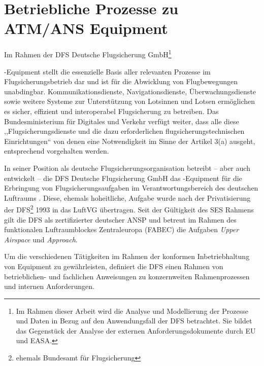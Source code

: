\chapter{Betriebliche Prozesse zu ATM/ANS Equipment}
    
    \begin{center}
        \footnotesize
        Im Rahmen der DFS Deutsche Flugsicherung GmbH\footnote{Im Rahmen dieser Arbeit wird die Analyse und Modellierung der Prozesse und Daten in Bezug auf den Anwendungsfall der \acs{DFS} betrachtet. Sie bildet das Gegenstück der Analyse der externen Anforderungsdokumente durch \acs{EU} und \ac{EASA}.}
    \end{center}
    
    \noindent
    \atmans-Equipment stellt die essenzielle Basis aller relevanten Prozesse im Flugsicherungsbetrieb dar und ist für die Abwicklung von Flugbewegungen unabdingbar. 
    Kommunikationsdienste, Navigationsdienste, Überwachungsdienste sowie weitere Systeme zur Unterstützung von Lotsinnen und Lotsen ermöglichen es sicher, effizient und interoperabel Flugsicherung zu betreiben.
    Das Bundesministerium für Digitales und Verkehr verfügt weiter, dass alle diese ,,Flugsicherungsdienste und die dazu erforderlichen flugsicherungstechnischen Einrichtungen`` von denen eine Notwendigkeit im Sinne der  Artikel 3(a) ausgeht, entsprechend vorgehalten werden.
    \cite[§27 d]{luftvg}
    
    \medskip
    In seiner Position als deutsche Flugsicherungsorganisation betreibt -- aber auch entwickelt -- die DFS Deutsche Flugsicherung GmbH das \atmans-Equipment für die Erbringung von Flugsicherungsaufgaben im Verantwortungsbereich des deutschen Luftraums 
    \cite[§27 c]{luftvg}.
    Diese, ehemals hoheitliche, Aufgabe wurde nach der Privatisierung der \ac{DFS}\footnote{ehemals Bundesamt für Flugsicherung} 1993 in das \ac{LuftVG} übertragen.
    Seit der Gültigkeit des \ac{SES} Rahmens gilt die \ac{DFS} als zertifizierter deutscher \acf{ANSP} und betreut im Rahmen des funktionalen Luftraumblockes Zentraleuropa (\acs{FABEC}) die Aufgaben \textit{Upper Airspace} und \textit{Approach}. 
    
    \medskip
    Um die verschiedenen Tätigkeiten im Rahmen der konformen Inbetriebhaltung von \atmans Equipment zu gewährleisten, definiert die \ac{DFS} einen Rahmen von betrieblichen- und fachlichen Anweisungen zu konzernweiten Rahmenprozessen und internen Anforderungen. \cite[vgl.][]{fa_freigaben,ba_technik}   
    
